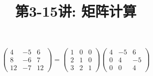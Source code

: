 \documentclass[a4paper, justified]{tufte-handout}
\title{第3-15讲: 矩阵计算}
\date{\zhtoday} %
\begin{document}
\maketitle
\noplagiarism %
\begin{abstract}
\end{abstract}
\beginrequired

\begin{problem}[TC 28.1-2]
\end{problem}

\begin{solution}
  $$
    \left(\begin{array}{ccc}
      4  & -5 & 6  \\
      8  & -6 & 7  \\
      12 & -7 & 12
    \end{array}\right)=\left(\begin{array}{ccc}
      1 & 0 & 0 \\
      2 & 1 & 0 \\
      3 & 2 & 1
    \end{array}\right)\left(\begin{array}{ccc}
      4 & -5 & 6  \\
      0 & 4  & -5 \\
      0 & 0  & 4
    \end{array}\right)
  $$
\end{solution}

\begin{problem}[TC 28.1-3]
\end{problem}
\end{document}
